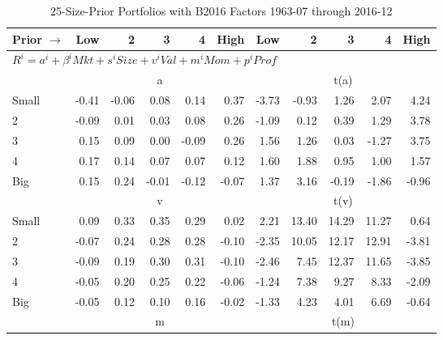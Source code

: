 
\begin{table}[!ht]
\centering
\caption{25-Size-Prior Portfolios with B2016 Factors 1963-07 through 2016-12}
\begin{tabular}{lrrrrrrrrrr}
  \toprule
    Prior $\rightarrow$ & Low & 2 & 3 & 4 & High & Low & 2 & 3 & 4 & High \\ 
  \midrule
  \multicolumn{11}{l}{$R^i=a^i+\beta^iMkt+s^iSize+v^iVal+m^iMom+p^iProf$} \\

  
    
      & \multicolumn{5}{c}{a} & \multicolumn{5}{c}{t(a)}
    
    \\
      \cmidrule(r){2-6} \cmidrule(r){7-11}

    Small   & -0.41  & -0.06  & 0.08  & 0.14  & 0.37  & -3.73  & -0.93  & 1.26  & 2.07  & 4.24  \\
         2  & -0.09  & 0.01  & 0.03  & 0.08  & 0.26  & -1.09  & 0.12  & 0.39  & 1.29  & 3.78  \\
         3  & 0.15  & 0.09  & 0.00  & -0.09  & 0.26  & 1.56  & 1.26  & 0.03  & -1.27  & 3.75  \\
         4  & 0.17  & 0.14  & 0.07  & 0.07  & 0.12  & 1.60  & 1.88  & 0.95  & 1.00  & 1.57  \\
    Big     & 0.15  & 0.24  & -0.01  & -0.12  & -0.07  & 1.37  & 3.16  & -0.19  & -1.86  & -0.96  \\

  
    
      & \multicolumn{5}{c}{v} & \multicolumn{5}{c}{t(v)}
    
    \\
      \cmidrule(r){2-6} \cmidrule(r){7-11}

    Small   & 0.09  & 0.33  & 0.35  & 0.29  & 0.02  & 2.21  & 13.40  & 14.29  & 11.27  & 0.64  \\
         2  & -0.07  & 0.24  & 0.28  & 0.28  & -0.10  & -2.35  & 10.05  & 12.17  & 12.91  & -3.81  \\
         3  & -0.09  & 0.19  & 0.30  & 0.31  & -0.10  & -2.46  & 7.45  & 12.37  & 11.65  & -3.85  \\
         4  & -0.05  & 0.20  & 0.25  & 0.22  & -0.06  & -1.24  & 7.38  & 9.27  & 8.33  & -2.09  \\
    Big     & -0.05  & 0.12  & 0.10  & 0.16  & -0.02  & -1.33  & 4.23  & 4.01  & 6.69  & -0.64  \\

  
    
      & \multicolumn{5}{c}{m} & \multicolumn{5}{c}{t(m)}
    

\end{tabular}
\end{table}
